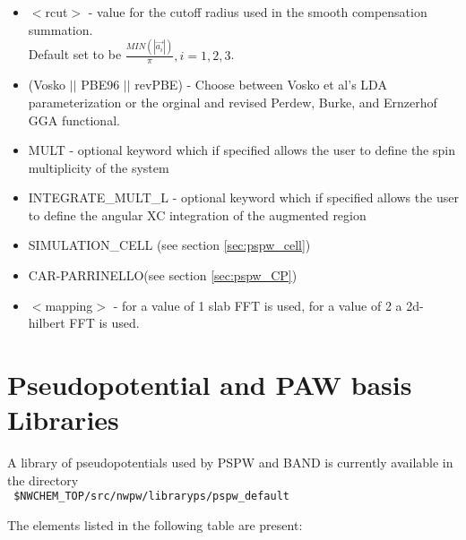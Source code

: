 \begin{itemize}
        \item $<$rcut$>$ - value for the cutoff radius used
                          in the smooth compensation summation. \\
                           Default set to be
                          $\frac{MIN(\left| \vec{a_i} \right|)}{\pi}, i=1,2,3$.
        \item (Vosko $||$ PBE96 $||$ revPBE) - Choose between Vosko et al's LDA 
                               parameterization or the orginal and revised Perdew, Burke, 
                               and Ernzerhof GGA functional.
        \item MULT - optional keyword which if specified allows the user to define the spin multiplicity
                     of the system
        \item INTEGRATE\_MULT\_L - optional keyword which if specified allows the user to define the 
                                   angular XC integration of the augmented region
        \item SIMULATION\_CELL (see section \ref{sec:pspw_cell})
        \item CAR-PARRINELLO(see section \ref{sec:pspw_CP})


        \item $<$mapping$>$ - for a value of 1 slab FFT is used, for a value of 2 a 2d-hilbert FFT is used.
\end{itemize}


\section{Pseudopotential and PAW basis Libraries}
\label{sec:psp_library}

A library of pseudopotentials used by PSPW and BAND is currently available  in the
directory \\
\verb+ $NWCHEM_TOP/src/nwpw/libraryps/pspw_default+

The elements listed in the following table are present:

